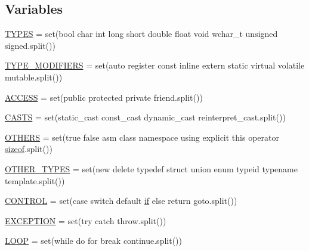 \subsection*{Variables}
\begin{DoxyCompactItemize}
\item 
\hyperlink{namespacecpp_1_1keywords_a56fd5baf357970548e1ec366edfc2c13}{T\+Y\+P\+ES} = set(\textquotesingle{}bool char int long short double float void wchar\+\_\+t unsigned signed\textquotesingle{}.split())
\item 
\hyperlink{namespacecpp_1_1keywords_af9282ce418d6b4b43dca5ed574caedd7}{T\+Y\+P\+E\+\_\+\+M\+O\+D\+I\+F\+I\+E\+RS} = set(\textquotesingle{}auto register const inline extern static virtual volatile mutable\textquotesingle{}.split())
\item 
\hyperlink{namespacecpp_1_1keywords_a786f41bbea982641425c819d10bb2064}{A\+C\+C\+E\+SS} = set(\textquotesingle{}public protected private friend\textquotesingle{}.split())
\item 
\hyperlink{namespacecpp_1_1keywords_aeba38dc38e188040f4ec44ba05092e7f}{C\+A\+S\+TS} = set(\textquotesingle{}static\+\_\+cast const\+\_\+cast dynamic\+\_\+cast reinterpret\+\_\+cast\textquotesingle{}.split())
\item 
\hyperlink{namespacecpp_1_1keywords_a15fe231fbad145538b73892804898809}{O\+T\+H\+E\+RS} = set(\textquotesingle{}true false asm class namespace using explicit this operator \hyperlink{classes__2_8js_a47ca7968904a6cccd03bb34c994adc04}{sizeof}\textquotesingle{}.split())
\item 
\hyperlink{namespacecpp_1_1keywords_aa86a5e35a3ace14022a5ca1b91baf207}{O\+T\+H\+E\+R\+\_\+\+T\+Y\+P\+ES} = set(\textquotesingle{}new delete typedef struct union enum typeid typename template\textquotesingle{}.split())
\item 
\hyperlink{namespacecpp_1_1keywords_a374dfe9c96681079802ba4724287b8ff}{C\+O\+N\+T\+R\+OL} = set(\textquotesingle{}case switch default \hyperlink{jquery_8js_a42cbfadee2b4749e8f699ea8d745a0e4}{if} else return goto\textquotesingle{}.split())
\item 
\hyperlink{namespacecpp_1_1keywords_a2665fb8a25a4dae03fa5d3dc975c537c}{E\+X\+C\+E\+P\+T\+I\+ON} = set(\textquotesingle{}try catch throw\textquotesingle{}.split())
\item 
\hyperlink{namespacecpp_1_1keywords_af0164c05398a2291487b76414102d555}{L\+O\+OP} = set(\textquotesingle{}while do for break continue\textquotesingle{}.split())
\item 

\end{DoxyCompactItemize}
